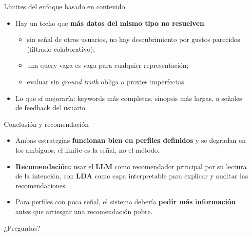 \documentclass[10pt,aspectratio=169]{beamer}
\begin{document}
\begin{frame}{Límites del enfoque basado en contenido}
  \begin{itemize}
    \item Hay un techo que \textbf{más datos del mismo tipo no resuelven}:
      \begin{itemize}
        \item sin señal de otros usuarios, no hay descubrimiento por gustos parecidos (filtrado colaborativo);
        \item una query vaga es vaga para cualquier representación;
        \item evaluar sin \textit{ground truth} obliga a proxies imperfectas.
      \end{itemize}
    \item Lo que sí mejoraría: keywords más completas, sinopsis más largas, o señales de feedback del usuario.
  \end{itemize}
\end{frame}

\begin{frame}{Conclusión y recomendación}
  \begin{itemize}
    \item Ambas estrategias \textbf{funcionan bien en perfiles definidos} y se degradan en los ambiguos: el límite es la señal, no el método.
    \item \textbf{Recomendación:} usar el \textbf{LLM} como recomendador principal por su lectura de la intención, con \textbf{LDA} como capa interpretable para explicar y auditar las recomendaciones.
    \item Para perfiles con poca señal, el sistema debería \textbf{pedir más información} antes que arriesgar una recomendación pobre.
  \end{itemize}
  \vspace{0.6em}
  \centering \footnotesize ¿Preguntas?
\end{frame}
\end{document}

